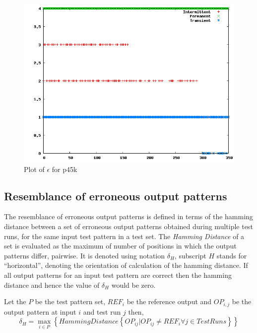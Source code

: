 \begin{figure}[h]
  \begin{center}
    \captionsetup{justification=centering}
    \includegraphics[scale=0.35]{figures/epsilonp45k.png}
    \caption{Plot of $\epsilon$ for p45k}
    \label{fig:epsilonp45k}
  \end{center}
\end{figure}

\subsection{Resemblance of erroneous output patterns}
The resemblance of erroneous output patterns is defined in terms of the hamming distance between a set of erroneous output patterns obtained during multiple test runs, for the same input test pattern in a test set. The \emph{Hamming Distance} of a set is evaluated as the maximum of number of positions in which the output patterns differ, pairwise. It is denoted using notation $\delta_H$, subscript $H$ stands for \enquote{horizontal}, denoting the orientation of calculation of the hamming distance. If all output patterns for an input test pattern are correct then the hamming distance and hence the value of $\delta_H$ would be zero.

Let the $P$ be the test pattern set, $REF_i$ be the reference output and $OP_{i,j}$ be the output pattern at input $i$ and test run $j$ then,
\[
\delta_H = \max\limits_{i\in P} \left\{HammingDistance 
\left\{OP_{ij} | OP_{ij} \neq REF_i \forall j \in TestRuns\right\} 
\right\} 
\]


